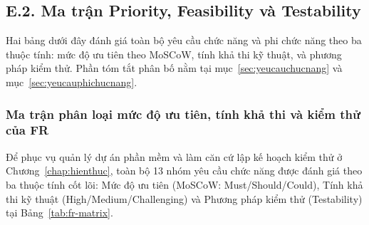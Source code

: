 
\subsection*{E.2. Ma trận Priority, Feasibility và Testability}
\label{apdx:matran}

Hai bảng dưới đây đánh giá toàn bộ yêu cầu chức năng và phi chức năng theo ba
thuộc tính: mức độ ưu tiên theo MoSCoW, tính khả thi kỹ thuật, và phương pháp
kiểm thử. Phần tóm tắt phân bố nằm tại mục~\ref{sec:yeucauchucnang} và
mục~\ref{sec:yeucauphichucnang}.

\subsubsection*{Ma trận phân loại mức độ ưu tiên, tính khả thi và kiểm thử của FR}
\label{subsec:fr-matrix}

Để phục vụ quản lý dự án phần mềm và làm căn cứ lập kế hoạch kiểm thử ở Chương~\ref{chap:hienthuc}, toàn bộ 13 nhóm yêu cầu chức năng được đánh giá theo ba thuộc tính cốt lõi: Mức độ ưu tiên (MoSCoW: Must/Should/Could), Tính khả thi kỹ thuật (High/Medium/Challenging) và Phương pháp kiểm thử (Testability) tại Bảng~\ref{tab:fr-matrix}.

